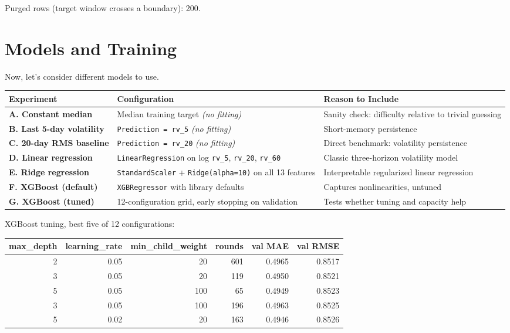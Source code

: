 \documentclass[11pt]{article}
\newcommand{\code}[1]{\texttt{#1}}
\begin{document}
Purged rows (target window crosses a boundary): 200.

\section{Models and Training}

Now, let's consider different models to use.

\begin{center}
{\small
\begin{tabular}{>{\raggedright}p{3.6cm}>{\raggedright}p{5.6cm}>{\raggedright\arraybackslash}p{5.3cm}}
\hline
\textbf{Experiment} & \textbf{Configuration} & \textbf{Reason to Include} \\
\hline
\textbf{A. Constant median} & Median training target \textit{(no fitting)} & Sanity check: difficulty relative to trivial guessing \\
\textbf{B. Last 5-day volatility} & \code{Prediction = rv\_5} \textit{(no fitting)} & Short-memory persistence \\
\textbf{C. 20-day RMS baseline} & \code{Prediction = rv\_20} \textit{(no fitting)} & Direct benchmark: volatility persistence \\
\textbf{D. Linear regression} & \code{LinearRegression} on log \code{rv\_5}, \code{rv\_20}, \code{rv\_60} & Classic three-horizon volatility model \\
\textbf{E. Ridge regression} & \code{StandardScaler} + \code{Ridge(alpha=10)} on all 13 features & Interpretable regularized linear regression \\
\textbf{F. XGBoost (default)} & \code{XGBRegressor} with library defaults & Captures nonlinearities, untuned \\
\textbf{G. XGBoost (tuned)} & 12-configuration grid, early stopping on validation & Tests whether tuning and capacity help \\
\hline
\end{tabular}
}
\end{center}

XGBoost tuning, best five of 12 configurations:

\begin{center}
{\small
\begin{tabular}{rrrrrr}
\hline
\textbf{max\_depth} & \textbf{learning\_rate} & \textbf{min\_child\_weight} & \textbf{rounds} & \textbf{val MAE} & \textbf{val RMSE} \\
\hline
2 & 0.05 & 20 & 601 & 0.4965 & 0.8517 \\
3 & 0.05 & 20 & 119 & 0.4950 & 0.8521 \\
5 & 0.05 & 100 & 65 & 0.4949 & 0.8523 \\
3 & 0.05 & 100 & 196 & 0.4963 & 0.8525 \\
5 & 0.02 & 20 & 163 & 0.4946 & 0.8526 \\
\hline
\end{tabular}
}
\end{center}
\end{document}
